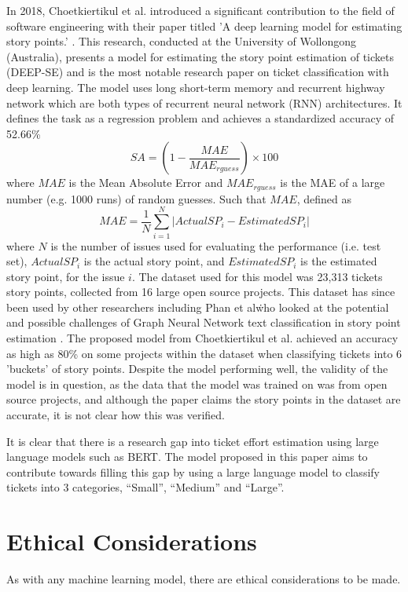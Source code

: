 \documentclass{UoYCSproject}
\begin{document}
    In 2018, Choetkiertikul et al.
    introduced a significant contribution to the field of software engineering with their paper titled 'A deep learning model for estimating story points.' \cite{8255666}.
    This research, conducted at the University of Wollongong (Australia), presents a model for estimating the story point estimation of tickets (DEEP-SE) and is the most notable research paper on ticket classification with deep learning.
    The model uses long short-term memory and recurrent highway network which are both types of recurrent neural network (RNN) architectures.
    It defines the task as a regression problem and achieves a standardized accuracy of 52.66\%
    \[SA = (1-\frac{MAE}{MAE_{rguess}}) \times 100\]
    where $MAE$ is the Mean Absolute Error and $MAE_{rguess}$ is the MAE of a large number (e.g. 1000 runs) of random guesses. Such that $MAE$, defined as \[ MAE = \frac{1}{N}\sum_{i=1}^{N}|ActualSP_{i} - EstimatedSP_{i}|\] where $N$ is the number of issues used for evaluating the performance (i.e. test set), $ActualSP_i$ is the actual story point, and $EstimatedSP_i$ is the estimated story point, for the issue $i$.
    The dataset used for this model was 23,313 tickets story points, collected from 16 large open source projects.
    This dataset has since been used by other researchers including Phan et al\. who looked at the potential and possible challenges of Graph Neural Network text
    classification in story point estimation \cite{phan2022story}.
    The proposed model from Choetkiertikul et al. achieved an accuracy as high as 80\% on some projects within the dataset when classifying tickets into 6 'buckets' of story points.
    Despite the model performing well, the validity of the model is in question, as the data that the model was trained on was from open source projects, and although the paper claims the story points in the dataset are accurate, it is not clear how this was verified.

    It is clear that there is a research gap into ticket effort estimation using large language models such as BERT.
    The model proposed in this paper aims to contribute towards filling this gap by using a large language model to classify tickets into 3 categories, “Small”, “Medium” and “Large”.

    \chapter{Ethical Considerations}
    As with any machine learning model, there are ethical considerations to be made.
\end{document}
